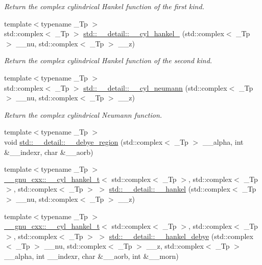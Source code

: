 \begin{DoxyCompactItemize}
\begin{DoxyCompactList}\small\item\em Return the complex cylindrical Hankel function of the first kind. \end{DoxyCompactList}\item 
{\footnotesize template$<$typename \+\_\+\+Tp $>$ }\\std\+::complex$<$ \+\_\+\+Tp $>$ \hyperlink{namespacestd_1_1____detail_a3a8bdfd85729c705dec2586dfa5b275b}{std\+::\+\_\+\+\_\+detail\+::\+\_\+\+\_\+cyl\+\_\+hankel\+\_} (std\+::complex$<$ \+\_\+\+Tp $>$ \+\_\+\+\_\+nu, std\+::complex$<$ \+\_\+\+Tp $>$ \+\_\+\+\_\+z)
\begin{DoxyCompactList}\small\item\em Return the complex cylindrical Hankel function of the second kind. \end{DoxyCompactList}\item 
{\footnotesize template$<$typename \+\_\+\+Tp $>$ }\\std\+::complex$<$ \+\_\+\+Tp $>$ \hyperlink{namespacestd_1_1____detail_ac73a4e3b8ac311760c998277aadb0fcb}{std\+::\+\_\+\+\_\+detail\+::\+\_\+\+\_\+cyl\+\_\+neumann} (std\+::complex$<$ \+\_\+\+Tp $>$ \+\_\+\+\_\+nu, std\+::complex$<$ \+\_\+\+Tp $>$ \+\_\+\+\_\+z)
\begin{DoxyCompactList}\small\item\em Return the complex cylindrical Neumann function. \end{DoxyCompactList}\item 
{\footnotesize template$<$typename \+\_\+\+Tp $>$ }\\void \hyperlink{namespacestd_1_1____detail_a3212c0a136417e862f2ed8e9684e053c}{std\+::\+\_\+\+\_\+detail\+::\+\_\+\+\_\+debye\+\_\+region} (std\+::complex$<$ \+\_\+\+Tp $>$ \+\_\+\+\_\+alpha, int \&\+\_\+\+\_\+indexr, char \&\+\_\+\+\_\+aorb)
\item 
{\footnotesize template$<$typename \+\_\+\+Tp $>$ }\\\hyperlink{struct____gnu__cxx_1_1____cyl__hankel__t}{\+\_\+\+\_\+gnu\+\_\+cxx\+::\+\_\+\+\_\+cyl\+\_\+hankel\+\_\+t}$<$ std\+::complex$<$ \+\_\+\+Tp $>$, std\+::complex$<$ \+\_\+\+Tp $>$, std\+::complex$<$ \+\_\+\+Tp $>$ $>$ \hyperlink{namespacestd_1_1____detail_a0346301fb5eb7faa659064335675f8c6}{std\+::\+\_\+\+\_\+detail\+::\+\_\+\+\_\+hankel} (std\+::complex$<$ \+\_\+\+Tp $>$ \+\_\+\+\_\+nu, std\+::complex$<$ \+\_\+\+Tp $>$ \+\_\+\+\_\+z)
\item 
{\footnotesize template$<$typename \+\_\+\+Tp $>$ }\\\hyperlink{struct____gnu__cxx_1_1____cyl__hankel__t}{\+\_\+\+\_\+gnu\+\_\+cxx\+::\+\_\+\+\_\+cyl\+\_\+hankel\+\_\+t}$<$ std\+::complex$<$ \+\_\+\+Tp $>$, std\+::complex$<$ \+\_\+\+Tp $>$, std\+::complex$<$ \+\_\+\+Tp $>$ $>$ \hyperlink{namespacestd_1_1____detail_a4051efdcdf6d1ab4a4b26c1c9f6752b6}{std\+::\+\_\+\+\_\+detail\+::\+\_\+\+\_\+hankel\+\_\+debye} (std\+::complex$<$ \+\_\+\+Tp $>$ \+\_\+\+\_\+nu, std\+::complex$<$ \+\_\+\+Tp $>$ \+\_\+\+\_\+z, std\+::complex$<$ \+\_\+\+Tp $>$ \+\_\+\+\_\+alpha, int \+\_\+\+\_\+indexr, char \&\+\_\+\+\_\+aorb, int \&\+\_\+\+\_\+morn)

\end{DoxyCompactItemize}
